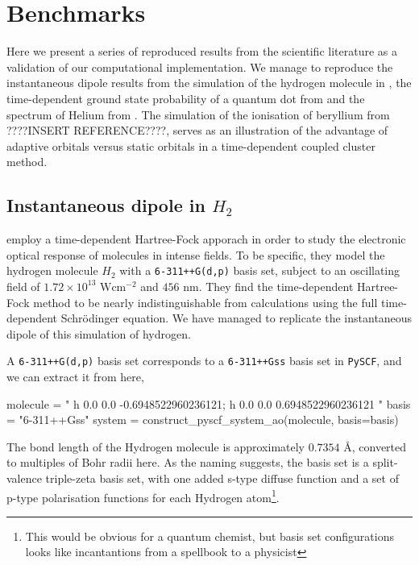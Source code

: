 \chapter{Benchmarks}

Here we present a series of reproduced results from the scientific literature as 
a validation of our computational implementation. We manage to reproduce the 
instantaneous dipole results from the simulation of the 
hydrogen molecule in \citeauthor{li2005time}\cite{li2005time},
the time-dependent ground state probability of a quantum dot from 
\citeauthor{Zanghellini04}\cite{Zanghellini04}
and the spectrum of Helium from
\citeauthor{pedersen2019symplectic}\cite{pedersen2019symplectic}.
The simulation of the ionisation of beryllium 
from ????INSERT REFERENCE????, serves as an illustration of the advantage of
adaptive orbitals versus static orbitals in a time-dependent coupled cluster method.


\section{Instantaneous dipole in $H_2$}

\citeauthor{li2005time}\cite{li2005time} employ a time-dependent Hartree-Fock 
apporach in order to study the electronic optical response of molecules 
in intense fields. To be specific, they model the hydrogen molecule $H_2$ 
with a \lstinline{6-311++G(d,p)} basis set, subject to an oscillating field 
of $1.72\times10^13\text{ W} \text{cm}^{-2}$ and $456\text{ nm}$. They find the time-dependent
Hartree-Fock method to be nearly indistinguishable from calculations using the 
full time-dependent Schrödinger equation. We have managed to replicate the 
instantaneous dipole of this simulation of hydrogen.

A \lstinline{6-311++G(d,p)} basis set corresponds to a \lstinline{6-311++Gss} 
basis set in \lstinline{PySCF}, and we can extract it from here,
\begin{python}
molecule = "
    h 0.0 0.0 -0.6948522960236121;
    h 0.0 0.0  0.6948522960236121
    "
basis = "6-311++Gss"
system = construct_pyscf_system_ao(molecule, basis=basis)
\end{python}
The bond length of the Hydrogen molecule is approximately $0.7354\text{ Å}$, converted 
to multiples of Bohr radii here. As the naming suggests, the basis set is a split-valence 
triple-zeta basis set, with one added s-type diffuse function and a set of p-type
polarisation 
functions for each Hydrogen atom\footnote{This would be obvious for a quantum chemist,
but basis set configurations looks like incantantions from a spellbook to a physicist}.

